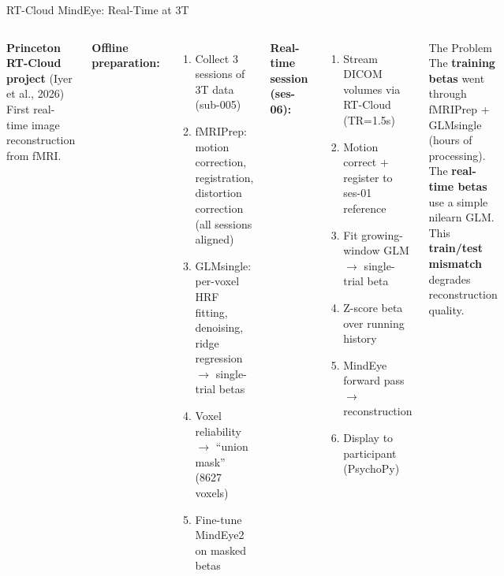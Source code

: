 \documentclass[aspectratio=169,12pt]{beamer}
\begin{document}

\begin{frame}{RT-Cloud MindEye: Real-Time at 3T}
\begin{columns}[T]
\textbf{Princeton RT-Cloud project} (Iyer et al., 2026)\\
First real-time image reconstruction from fMRI.

\vspace{0.5em}
\textbf{Offline preparation:}
\begin{enumerate}\setlength\itemsep{0.1em}
    \item Collect 3 sessions of 3T data (sub-005)
    \item fMRIPrep: motion correction, registration,\\ distortion correction (all sessions aligned)
    \item GLMsingle: per-voxel HRF fitting, denoising,\\ridge regression $\rightarrow$ single-trial betas
    \item Voxel reliability $\rightarrow$ ``union mask'' (8627 voxels)
    \item Fine-tune MindEye2 on masked betas
\end{enumerate}

\vspace{0.3em}
\textbf{Real-time session (ses-06):}
\begin{enumerate}\setlength\itemsep{0.1em}
    \setcounter{enumi}{4}
    \item Stream DICOM volumes via RT-Cloud (TR=1.5s)
    \item Motion correct + register to ses-01 reference
    \item Fit growing-window GLM $\rightarrow$ single-trial beta
    \item Z-score beta over running history
    \item MindEye forward pass $\rightarrow$ reconstruction
    \item Display to participant (PsychoPy)
\end{enumerate}

\begin{alertblock}{The Problem}
The \textbf{training betas} went through fMRIPrep + GLMsingle (hours of processing).\\[0.3em]
The \textbf{real-time betas} use a simple nilearn GLM.\\[0.3em]
This \textbf{train/test mismatch} degrades reconstruction quality.
\end{alertblock}
\end{columns}
\end{frame}
\end{document}
